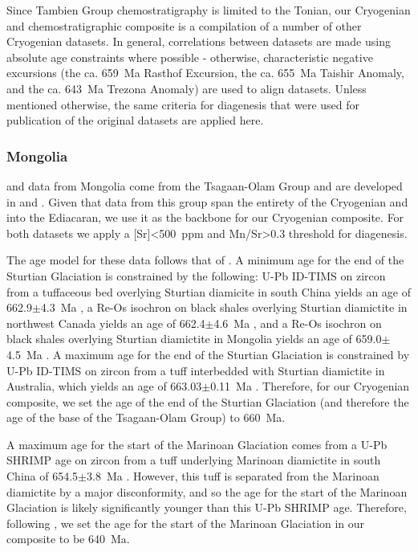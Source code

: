 Since Tambien Group chemostratigraphy is limited to the Tonian, our Cryogenian \dC and \SrSr chemostratigraphic composite is a compilation of a number of other Cryogenian datasets. In general, correlations between datasets are made using absolute age constraints where possible - otherwise, characteristic negative \dC excursions (the ca. 659~Ma Rasthof Excursion, the ca. 655~Ma Taishir Anomaly, and the ca. 643~Ma Trezona Anomaly) are used to align datasets. Unless mentioned otherwise, the same criteria for diagenesis that were used for publication of the original datasets are applied here.

\subsubsection{Mongolia}

\dC and \SrSr data from Mongolia come from the Tsagaan-Olam Group and are developed in \citet{Bold2016a} and \citet{Brasier1996a}. Given that data from this group span the entirety of the Cryogenian and into the Ediacaran, we use it as the backbone for our Cryogenian composite. For both datasets we apply a [Sr]\textless500~ppm and Mn/Sr\textgreater0.3 threshold for \SrSr diagenesis.

The age model for these data follows that of \citet{Bold2016a}. A minimum age for the end of the Sturtian Glaciation is constrained by the following: U-Pb ID-TIMS on zircon from a tuffaceous bed overlying Sturtian diamicite in south China yields an age of 662.9$\pm$4.3~Ma \citep{Zhou2004a}, a Re-Os isochron on black shales overlying Sturtian diamictite in northwest Canada yields an age of 662.4$\pm$4.6~Ma \citep{Rooney2014a}, and a Re-Os isochron on black shales overlying Sturtian diamictite in Mongolia yields an age of 659.0$\pm$4.5~Ma \citep{Rooney2015a}. A maximum age for the end of the Sturtian Glaciation is constrained by U-Pb ID-TIMS on zircon from a tuff interbedded with Sturtian diamictite in Australia, which yields an age of 663.03$\pm$0.11~Ma \citep{Cox2018b}. Therefore, for our Cryogenian composite, we set the age of the end of the Sturtian Glaciation (and therefore the age of the base of the Tsagaan-Olam Group) to 660~Ma.

A maximum age for the start of the Marinoan Glaciation comes from a U-Pb SHRIMP age on zircon from a tuff underlying Marinoan diamictite in south China of 654.5$\pm$3.8~Ma \citep{Zhang2008b}. However, this tuff is separated from the Marinoan diamictite by a major disconformity, and so the age for the start of the Marinoan Glaciation is likely significantly younger than this U-Pb SHRIMP age. Therefore, following \citet{Bold2016a}, we set the age for the start of the Marinoan Glaciation in our composite to be 640~Ma.

